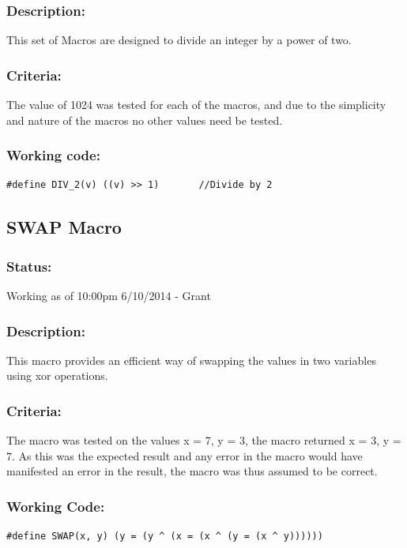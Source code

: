 \documentclass[]{report}
\begin{document}
\subsubsection{Description:}
This set of Macros are designed to divide an integer by a power of two.

\subsubsection{Criteria:}
The value of 1024 was tested for each of the macros, and due to the simplicity and nature of the macros no other values need be tested.

\subsubsection{Working code:}
\begin{lstlisting}
#define DIV_2(v) ((v) >> 1)       //Divide by 2
\end{lstlisting}

\subsection{SWAP Macro}
\subsubsection{Status:}
Working as of 10:00pm 6/10/2014 - Grant

\subsubsection{Description:}
This macro provides an efficient way of swapping the values in two variables using xor operations.

\subsubsection{Criteria:}
The macro was tested on the values x = 7, y = 3, the macro returned x = 3, y = 7. As this was the expected result and any error in the macro would have manifested an error in the result, the macro was thus assumed to be correct.

\subsubsection{Working Code:}
\begin{lstlisting}
#define SWAP(x, y) (y = (y ^ (x = (x ^ (y = (x ^ y))))))
\end{lstlisting}
\end{document}
